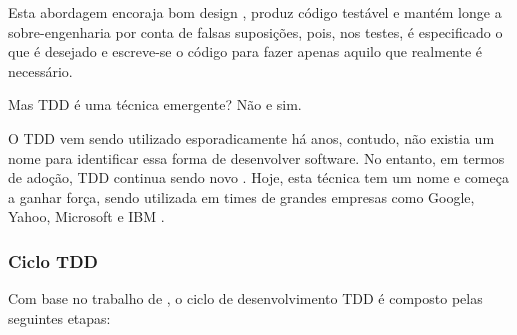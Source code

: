 Esta abordagem encoraja bom design \cite{GrowingOOByTests}, produz código testável e mantém longe a sobre-engenharia por conta de falsas suposições, pois, nos testes, é especificado o que é desejado e escreve-se o código para fazer apenas aquilo que realmente é necessário. \cite{TestDrivenKoskela, TDDbyExample, EmpiricalTDD}

Mas TDD é uma técnica emergente? Não e sim.

O TDD vem sendo utilizado esporadicamente há anos, contudo, não existia um nome para identificar essa forma de desenvolver software. No entanto, em termos de adoção, TDD continua sendo novo \cite{TestDrivenKoskela, TDDbyExample, EmpiricalTDD}. Hoje, esta técnica tem um nome e começa a ganhar força, sendo utilizada em times de grandes empresas como Google, Yahoo, Microsoft e IBM \cite{EmpiricalTDD}.

\subsubsection{Ciclo TDD}
\label{ssub:ciclo_tdd}

Com base no trabalho de , o ciclo de desenvolvimento TDD é composto pelas seguintes etapas:


